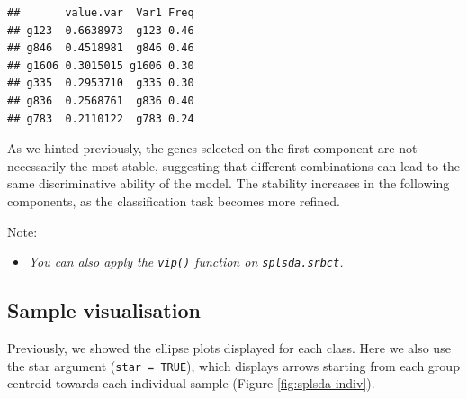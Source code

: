 \documentclass[]{book}
\newenvironment{Shaded}{\begin{snugshade}}{\end{snugshade}}
\newcommand{\KeywordTok}[1]{\textcolor[rgb]{0.13,0.29,0.53}{\textbf{#1}}}
\newcommand{\DataTypeTok}[1]{\textcolor[rgb]{0.13,0.29,0.53}{#1}}
\newcommand{\DecValTok}[1]{\textcolor[rgb]{0.00,0.00,0.81}{#1}}
\newcommand{\StringTok}[1]{\textcolor[rgb]{0.31,0.60,0.02}{#1}}
\newcommand{\CommentTok}[1]{\textcolor[rgb]{0.56,0.35,0.01}{\textit{#1}}}
\newcommand{\OperatorTok}[1]{\textcolor[rgb]{0.81,0.36,0.00}{\textbf{#1}}}
\newcommand{\NormalTok}[1]{#1}
\providecommand{\tightlist}{%
  \setlength{\itemsep}{0pt}\setlength{\parskip}{0pt}}
\begin{document}
\begin{Shaded}
\end{Shaded}

\begin{verbatim}
##       value.var  Var1 Freq
## g123  0.6638973  g123 0.46
## g846  0.4518981  g846 0.46
## g1606 0.3015015 g1606 0.30
## g335  0.2953710  g335 0.30
## g836  0.2568761  g836 0.40
## g783  0.2110122  g783 0.24
\end{verbatim}

As we hinted previously, the genes selected on the first component are
not necessarily the most stable, suggesting that different combinations
can lead to the same discriminative ability of the model. The stability
increases in the following components, as the classification task
becomes more refined.

Note:

\begin{itemize}
\tightlist
\item
  \emph{You can also apply the \texttt{vip()} function on
  \texttt{splsda.srbct}.}
\end{itemize}

\subsection{Sample visualisation}\label{sample-visualisation}

Previously, we showed the ellipse plots displayed for each class. Here
we also use the star argument (\texttt{star\ =\ TRUE}), which displays
arrows starting from each group centroid towards each individual sample
(Figure \ref{fig:splsda-indiv}).
\end{document}

